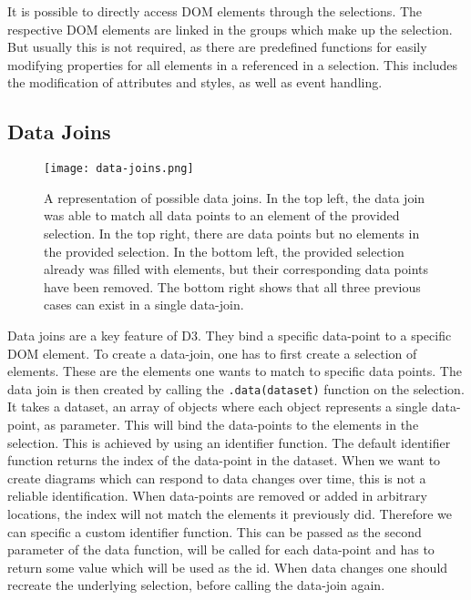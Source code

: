 It is possible to directly access DOM elements through the selections. The respective DOM elements are linked in the groups which make up the selection. But usually this is not required, as there are predefined functions for easily modifying properties for all elements in a referenced in a selection. This includes the modification of attributes and styles, as well as event handling. 

\subsection{Data Joins}

\begin{figure}
    \texttt{[image: data-joins.png]}
    \caption[data-joins]{A representation of possible data joins. In the top left, the data join was able to match all data points to an element of the provided selection. In the top right, there are data points but no elements in the provided selection. In the bottom left, the provided selection already was filled with elements, but their corresponding data points have been removed. The bottom right shows that all three previous cases can exist in a single data-join.}
    \label{fig:data-joins}
\end{figure}


Data joins are a key feature of D3. They bind a specific data-point to a specific DOM element. To create a data-join, one has to first create a selection of elements. These are the elements one wants to match to specific data points. The data join is then created by calling the \verb|.data(dataset)| function on the selection. It takes a dataset, an array of objects where each object represents a single data-point, as parameter. This will bind the data-points to the elements in the selection. This is achieved by using an identifier function. The default identifier function returns the index of the data-point in the dataset. When we want to create diagrams which can respond to data changes over time, this is not a reliable identification. When data-points are removed or added in arbitrary locations, the index will not match the elements it previously did. Therefore we can specific a custom identifier function. This can be passed as the second parameter of the data function, will be called for each data-point and has to return some value which will be used as the id. When data changes one should recreate the underlying selection, before calling the data-join again.

